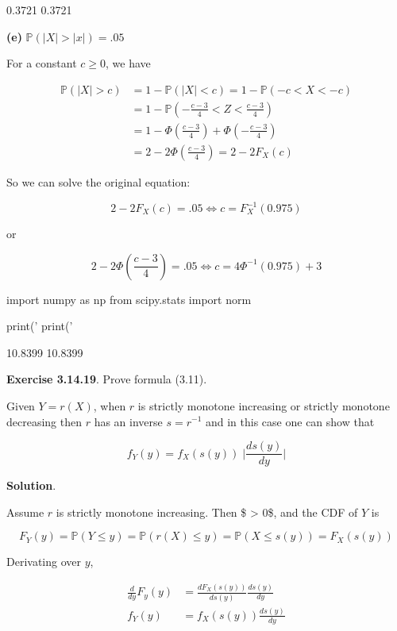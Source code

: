 \begin{console}
0.3721
0.3721
\end{console}

\textbf{(e)} \(\mathbb{P}(|X| > |x|) = .05\)

For a constant \(c \geq 0\), we have

\begin{align}
\mathbb{P}(|X| > c) &= 1 - \mathbb{P}(|X| < c) = 1 - \mathbb{P}(-c < X < -c) \\
&= 1 - \mathbb{P}\left( -\frac{c - 3}{4} < Z < \frac{c - 3}{4} \right)\\
&= 1 - \Phi\left( \frac{c - 3}{4} \right) + \Phi\left( -\frac{c - 3}{4} \right) \\
&= 2 - 2 \Phi\left( \frac{c - 3}{4} \right) = 2 - 2 F_X(c)
\end{align}

So we can solve the original equation:

\[ 2 - 2 F_X(c) = .05 \Longleftrightarrow c = F_X^{-1}(0.975) \]

or

\[ 2 - 2 \Phi\left( \frac{c - 3}{4} \right) = .05 \Longleftrightarrow c = 4 \Phi^{-1}(0.975) + 3 \]

\begin{python}
import numpy as np
from scipy.stats import norm

print('%
print('%
\end{python}

\begin{console}
10.8399
10.8399
\end{console}

\textbf{Exercise 3.14.19}. Prove formula (3.11).

Given \(Y = r(X)\), when \(r\) is strictly monotone increasing or
strictly monotone decreasing then \(r\) has an inverse \(s = r^{-1}\)
and in this case one can show that

\[ f_Y(y) = f_X(s(y)) \;\Bigg| \frac{ds(y)}{dy} \Bigg|\]

\textbf{Solution}.

Assume \(r\) is strictly monotone increasing. Then \$ 
\textgreater{} 0\$, and the CDF of \(Y\) is

\[ F_Y(y) = \mathbb{P}(Y \leq y) = \mathbb{P}(r(X) \leq y) = \mathbb{P}(X \leq s(y)) = F_X(s(y)) \]

Derivating over \(y\),

\begin{align}
\frac{d}{dy} F_y(y) &= \frac{d F_X(s(y))}{d s(y)} \frac{d s(y)}{dy} \\
f_Y(y) &= f_X(s(y)) \frac{d s(y)}{dy}
\end{align}

